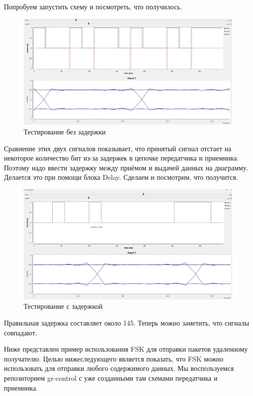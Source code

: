 \documentclass{article}
\begin{document}
\newpage
\vspace*{-2cm}
Попробуем запустить схему и посмотреть, что получилось.
\begin{figure}[ht]
    \centering
    \includegraphics[width=0.8\linewidth]{2.png}
    \caption{Тестирование без задержки}
    \label{fig:enter-label2}
\end{figure}

Сравнение этих двух сигналов показывает, что принятый сигнал отстает на некоторое количество бит из-за задержек в цепочке передатчика и приемника. Поэтому надо ввести задержку между приёмом и выдачей данных на диаграмму. Делается это при помощи блока Delay. Сделаем и посмотрим, что получится.
\begin{figure}[ht]
    \centering
    \includegraphics[width=0.8\linewidth]{3.png}
    \caption{Тестирование с задержкой}
    \label{fig:enter-label3}
\end{figure}

Правильная задержка составляет около 145. Теперь можно заметить, что сигналы совпадают.
\newpage





\newpage
Ниже представлен пример использования FSK для отправки пакетов удаленному получателю. Целью нижеследующего является показать, что FSK можно использовать для отправки любого содержимого данных. Мы воспользуемся репозиторием gr-control с уже созданными там схемами передатчика и приемника.
\end{document}
